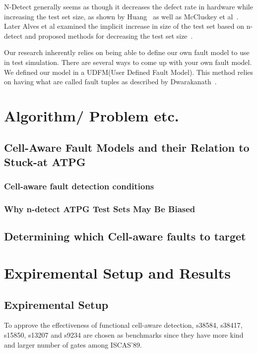 \documentclass[10 pt, technote]{IEEEtran}
\begin{document}
N-Detect generally seems as though it decreases the defect rate in hardware while increasing the test set size, as shown by Huang~\cite{1613177} as well as McCluskey et al~\cite{894222}. Later Alves et al examined the implicit increase in size of the test set based on n-detect and proposed methods for decreasing the test set size~\cite{5361309}. 

Our research inherently relies on being able to define our own fault model to use in test simulation. There are several ways to come up with your own fault model. We defined our model in a UDFM(User Defined Fault Model). This method relies on having what are called fault tuples as described by Dwarakanath~\cite{Dwarakanath:2000:UFS:337292.337779}.
\section{Algorithm/ Problem etc.}

\subsection{Cell-Aware Fault Models and their Relation to Stuck-at ATPG}

\subsubsection{Cell-aware fault detection conditions}

\subsubsection{Why n-detect ATPG Test Sets May Be Biased}

\subsection{Determining which Cell-aware faults to target}

\section{Expiremental Setup and Results}
\subsection{Expiremental Setup}
To approve the effectiveness of functional cell-aware detection, s38584, s38417, s15850, s13207 and s9234 are chosen as benchmarks since they have more kind and larger number of gates among ISCAS’89. 
\end{document}
